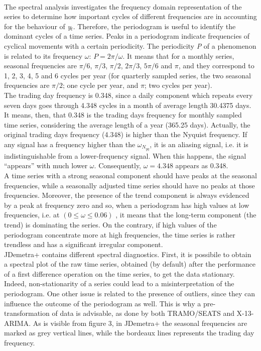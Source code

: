 \documentclass{article}
\begin{document}
\\The spectral analysis investigates the frequency domain representation of the series to determine how important cycles of different frequencies are in accounting for the behaviour of \textit{y$_t$}. Therefore, the periodogram is useful to identify the dominant cycles of a time series. Peaks in a periodogram indicate frequencies of cyclical movements with a certain periodicity. The periodicity \textit{P} of a phenomenon is related to its frequency $\omega$: $P=2 \pi / \omega$. It means that for a monthly series, seasonal frequencies are $\pi/6$, $\pi/3$, $\pi/2$, $2\pi/3$, $5\pi/6$ and $\pi$, and they correspond to 1, 2, 3, 4, 5 and 6 cycles per year (for quarterly sampled series, the two seasonal frequencies are $\pi/2$; one cycle per year, and $\pi$; two cycles per year).\\The trading day frequency is 0.348, since a daily component which repeats every seven days goes through 4.348 cycles in a month of average length 30.4375 days. It means, then, that 0.348 is the trading days frequency for monthly sampled time series, considering the average length of a year (365.25 days). Actually, the original trading days frequency (4.348) is higher than the Nyquist frequency. If any signal has a frequency higher than the $\omega_{N_{yq}}$, it is an aliasing signal, i.e. it is indistinguishable from a lower-frequency signal. When this happens, the signal “appears” with much lower $\omega$. Consequently, $\omega=4.348$ appears as 0.348.\\A time series with a strong seasonal component should have peaks at the seasonal frequencies, while a seasonally adjusted time series should have no peaks at those frequencies. Moreover, the presence of the trend component is always evidenced by a peak at frequency zero and so, when a periodogram has high values at low frequencies, i.e. at $(0 \leq \omega \leq 0.06)$ , it means that the long-term component (the trend) is dominating the series. On the contrary, if high values of the periodogram concentrate more at high frequencies, the time series is rather trendless and has a significant irregular component.\\JDemetra+ contains different spectral diagnostics. First, it is possibile to obtain a spectral plot of the raw time series, obtained (by default) after the performance of a first difference operation on the time series, to get the data stationary. Indeed, non-stationarity of a series could lead to a misinterpretation of the periodogram.  One other issue is related to the presence of outliers, since they can influence the outcome of the periodogram as well. This is why a pre-transformation of data is advisable, as done by both TRAMO/SEATS and X-13-ARIMA.  As is visible from figure 3, in JDemetra+ the seasonal frequencies are marked as grey vertical lines, while the bordeaux lines represents the trading day frequency.\\
\end{document}
